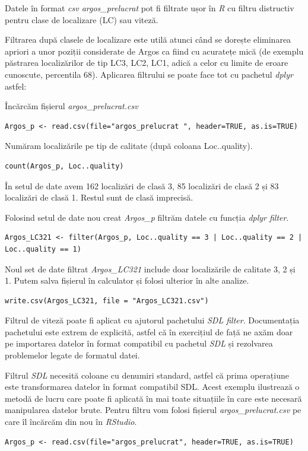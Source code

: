 \documentclass[11pt,onehalfspacing]{elife}
\begin{document}
Datele în format \textit{csv argos\_prelucrat} pot fi filtrate ușor în \textit{R} cu filtru distructiv pentru clase de localizare (LC) sau viteză.

Filtrarea după clasele de localizare este utilă atunci când se dorește eliminarea apriori a unor poziții considerate de Argos ca fiind cu acuratețe mică (de exemplu păstrarea localizărilor de tip LC3, LC2, LC1, adică a celor cu limite de eroare cunoscute, percentila 68). Aplicarea filtrului se poate face tot cu pachetul \textit{dplyr} astfel:

Încărcăm fișierul \textit{argos\_prelucrat.csv}
\begin{lstlisting}
Argos_p <- read.csv(file="argos_prelucrat ", header=TRUE, as.is=TRUE)
\end{lstlisting}

Număram localizările pe tip de calitate (după coloana Loc..quality).
\begin{lstlisting}
count(Argos_p, Loc..quality)
\end{lstlisting}

În setul de date avem 162 localizări de clasă 3, 85 localizări de clasă 2 și 83 localizări de clasă 1. Restul sunt de clasă imprecisă.

Folosind setul de date nou creat \textit{Argos\_p} filtrăm datele cu funcția \textit{dplyr filter}.
\begin{lstlisting}
Argos_LC321 <- filter(Argos_p, Loc..quality == 3 | Loc..quality == 2 | Loc..quality == 1)
\end{lstlisting}

Noul set de date filtrat \textit{Argos\_LC321} include doar localizările de calitate 3, 2 și 1. Putem salva fișierul în calculator și folosi ulterior în alte analize.
\begin{lstlisting}
write.csv(Argos_LC321, file = "Argos_LC321.csv")
\end{lstlisting}

Filtrul de viteză poate fi aplicat cu ajutorul pachetului \textit{SDL filter}. Documentația pachetului este extrem de explicită, astfel că în exercițiul de față ne axăm doar pe importarea datelor în format compatibil cu pachetul \textit{SDL} și rezolvarea problemelor legate de formatul datei.

Filtrul \textit{SDL} necesită coloane cu denumiri standard, astfel că prima operațiune este transformarea datelor în format compatibil SDL. Acest exemplu ilustrează o metodă de lucru care poate fi aplicată în mai toate situațiile în care este necesară manipularea datelor brute. Pentru filtru vom folosi fișierul \textit{argos\_prelucrat.csv} pe care îl încărcăm din nou în \textit{RStudio}.
\begin{lstlisting}
Argos_p <- read.csv(file="argos_prelucrat", header=TRUE, as.is=TRUE)
\end{lstlisting}
\end{document}
